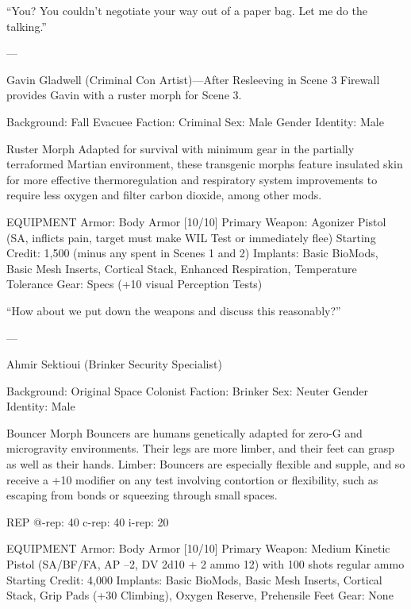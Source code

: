 “You? You couldn't negotiate your way out of a paper bag. Let me do the talking.”

---

Gavin Gladwell (Criminal Con Artist)—After Resleeving in Scene 3
Firewall provides Gavin with a ruster morph for Scene 3.

Background: Fall Evacuee
Faction: Criminal
Sex: Male
Gender Identity: Male

Ruster Morph
Adapted for survival with minimum gear in the partially terraformed Martian environment, these transgenic morphs feature insulated skin for more effective thermoregulation and respiratory system improvements to require less oxygen and filter carbon dioxide, among other mods.

EQUIPMENT
Armor: Body Armor [10/10]
Primary Weapon: Agonizer Pistol (SA, inflicts pain, target must make WIL Test or immediately flee)
Starting Credit: 1,500 (minus any spent in Scenes 1 and 2)
Implants: Basic BioMods, Basic Mesh Inserts, Cortical Stack, Enhanced Respiration, Temperature Tolerance
Gear: Specs (+10 visual Perception Tests)

“How about we put down the weapons and discuss this reasonably?”

---

Ahmir Sektioui (Brinker Security Specialist)

Background: Original Space Colonist
Faction: Brinker
Sex: Neuter
Gender Identity: Male

Bouncer Morph
Bouncers are humans genetically adapted for zero-G and microgravity environments. Their legs are more limber, and their feet can grasp as well as their hands.
Limber: Bouncers are especially flexible and supple, and so receive a +10 modifier on any test involving contortion or flexibility, such as escaping from bonds or squeezing through small spaces.

REP
@-rep:	40
c-rep:	40
i-rep:	20

EQUIPMENT
Armor: Body Armor [10/10]
Primary Weapon: Medium Kinetic Pistol (SA/BF/FA, AP –2, DV 2d10 + 2 ammo 12) with 100 shots regular ammo
Starting Credit: 4,000
Implants: Basic BioMods, Basic Mesh Inserts, Cortical Stack, Grip Pads (+30 Climbing), Oxygen Reserve, Prehensile Feet
Gear: None

